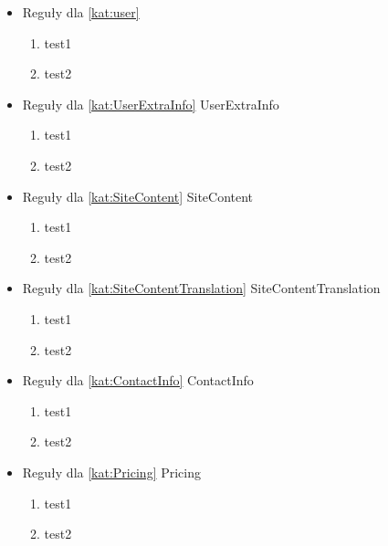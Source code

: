 \begin{itemize}[label={}]
    \setlength\itemsep{1em}
    \item Reguły dla \ref{kat:user} 
    \begin{enumerate}[label={\textbf{REG/\protect\threedigits{\arabic{enumi}}}}, wide, labelwidth=!]
        \item test1
        \item test2
    \end{enumerate}
    \item Reguły dla \ref{kat:UserExtraInfo} UserExtraInfo
    \begin{enumerate}[label={\textbf{REG/\protect\threedigits{\arabic{enumi}}}}, wide, labelwidth=!, resume]
        \item test1
        \item test2
    \end{enumerate}
    \item Reguły dla \ref{kat:SiteContent} SiteContent
    \begin{enumerate}[label={\textbf{REG/\protect\threedigits{\arabic{enumi}}}}, wide, labelwidth=!, resume]
        \item test1
        \item test2
    \end{enumerate}
    \item Reguły dla \ref{kat:SiteContentTranslation} SiteContentTranslation
    \begin{enumerate}[label={\textbf{REG/\protect\threedigits{\arabic{enumi}}}}, wide, labelwidth=!, resume]
        \item test1
        \item test2
    \end{enumerate}
    \item Reguły dla \ref{kat:ContactInfo} ContactInfo
    \begin{enumerate}[label={\textbf{REG/\protect\threedigits{\arabic{enumi}}}}, wide, labelwidth=!, resume]
        \item test1
        \item test2
    \end{enumerate}
    \item Reguły dla \ref{kat:Pricing} Pricing
    \begin{enumerate}[label={\textbf{REG/\protect\threedigits{\arabic{enumi}}}}, wide, labelwidth=!, resume]
        \item test1
        \item test2
    \end{enumerate}

\end{itemize}
